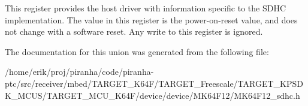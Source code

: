 This register provides the host driver with information specific to the S\+D\+HC implementation. The value in this register is the power-\/on-\/reset value, and does not change with a software reset. Any write to this register is ignored. 

The documentation for this union was generated from the following file\+:\begin{DoxyCompactItemize}
\item 
/home/erik/proj/piranha/code/piranha-\/ptc/src/receiver/mbed/\+T\+A\+R\+G\+E\+T\+\_\+\+K64\+F/\+T\+A\+R\+G\+E\+T\+\_\+\+Freescale/\+T\+A\+R\+G\+E\+T\+\_\+\+K\+P\+S\+D\+K\+\_\+\+M\+C\+U\+S/\+T\+A\+R\+G\+E\+T\+\_\+\+M\+C\+U\+\_\+\+K64\+F/device/device/\+M\+K64\+F12/M\+K64\+F12\+\_\+sdhc.\+h\end{DoxyCompactItemize}
